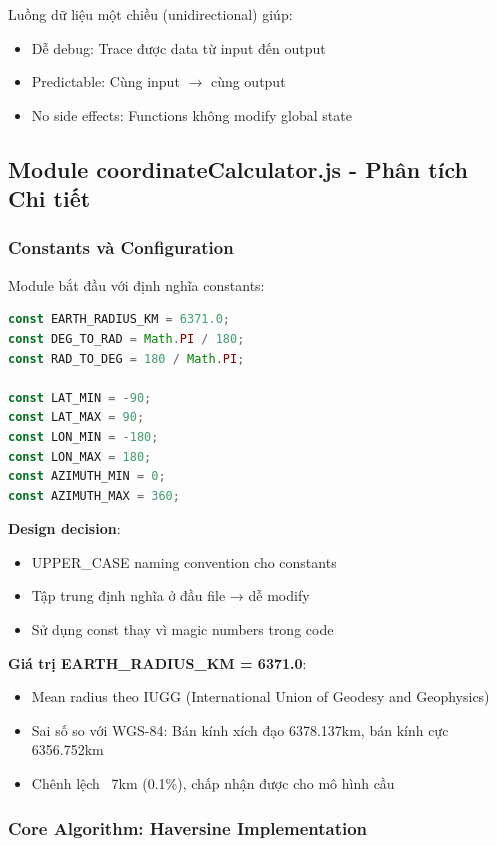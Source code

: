 Luồng dữ liệu một chiều (unidirectional) giúp:
\begin{itemize}
    \item Dễ debug: Trace được data từ input đến output
    \item Predictable: Cùng input $\rightarrow$ cùng output
    \item No side effects: Functions không modify global state
\end{itemize}

\subsection{Module coordinateCalculator.js - Phân tích Chi tiết}

\subsubsection{Constants và Configuration}
Module bắt đầu với định nghĩa constants:

\begin{lstlisting}[language=JavaScript, caption={Constants definition}]
const EARTH_RADIUS_KM = 6371.0;
const DEG_TO_RAD = Math.PI / 180;
const RAD_TO_DEG = 180 / Math.PI;

const LAT_MIN = -90;
const LAT_MAX = 90;
const LON_MIN = -180;
const LON_MAX = 180;
const AZIMUTH_MIN = 0;
const AZIMUTH_MAX = 360;
\end{lstlisting}

\textbf{Design decision}:
\begin{itemize}
    \item UPPER\_CASE naming convention cho constants
    \item Tập trung định nghĩa ở đầu file → dễ modify
    \item Sử dụng const thay vì magic numbers trong code
\end{itemize}

\textbf{Giá trị EARTH\_RADIUS\_KM = 6371.0}:
\begin{itemize}
    \item Mean radius theo IUGG (International Union of Geodesy and Geophysics)
    \item Sai số so với WGS-84: Bán kính xích đạo 6378.137km, bán kính cực 6356.752km
    \item Chênh lệch ~7km (0.1\%), chấp nhận được cho mô hình cầu
\end{itemize}

\subsubsection{Core Algorithm: Haversine Implementation}

